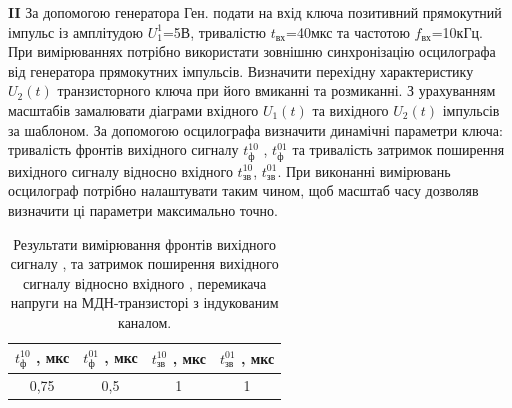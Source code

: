 \documentclass[a4paper,14pt]{extreport}
\begin{document}
\textbf{II} За допомогою генератора Ген. подати на вхід ключа позитивний прямокутний імпульс із амплітудою $U_1^1$=5В, тривалістю $t_{\text{вх}}$=40мкс та частотою $f_{\text{вх}}$=10кГц.
При вимірюваннях потрібно використати зовнішню синхронізацію осцилографа від генератора прямокутних імпульсів.
Визначити перехідну характеристику $U_2(t)$ транзисторного ключа при його вмиканні та розмиканні. З урахуванням масштабів замалювати діаграми вхідного $U_1(t)$  та вихідного $U_2(t)$  імпульсів за шаблоном. За допомогою осцилографа визначити динамічні параметри ключа: тривалість фронтів вихідного сигналу $t_{\text{ф}}^{10}$ , $t_{\text{ф}}^{01}$ та тривалість затримок поширення вихідного сигналу відносно вхідного $t_{\text{зв}}^{10}$, $t_{\text{зв}}^{01}$. При виконанні вимірювань осцилограф потрібно налаштувати таким чином, щоб масштаб часу дозволяв визначити ці параметри максимально точно.

\begin{table}[h]
	\begin{center}
		\begin{tabular}{|c|c|c|c|}
			\hline
			 $t_{\text{ф}}^{10}$ , мкс& $t_{\text{ф}}^{01}$ , мкс &$t_{\text{зв}}^{10}$ , мкс  & $t_{\text{зв}}^{01}$ , мкс \\ \hline
			 0,75& 0,5 &  1& 1 \\ \hline
		\end{tabular}
		\caption{Результати вимірювання фронтів вихідного сигналу ,  та затримок поширення вихідного сигналу відносно вхідного ,  перемикача напруги на МДН-транзисторі з індукованим каналом.}
		\label{tab4}
	\end{center}
\end{table}
\end{document}
